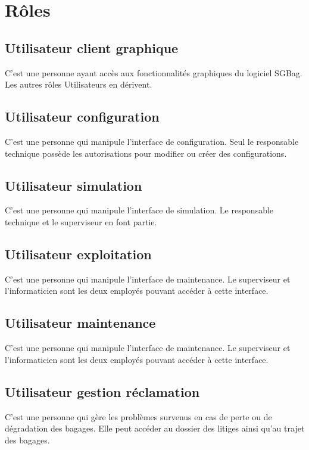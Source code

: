 \section{Rôles}
\subsection{Utilisateur client graphique}
\label{uiUser}
C'est une personne ayant accès aux fonctionnalités graphiques du logiciel SGBag. Les autres rôles \og Utilisateurs \fg en dérivent.

\subsection{Utilisateur configuration}
\label{confUser}
C'est une personne qui manipule l'interface de configuration. Seul le responsable technique possède les autorisations pour modifier ou créer des configurations.

\subsection{Utilisateur simulation}
\label{simUser}
C'est une personne qui manipule l'interface de simulation. Le responsable technique et le superviseur en font partie.

\subsection{Utilisateur exploitation}
\label{expUser}
C'est une personne qui manipule l'interface de maintenance. Le superviseur et l'informaticien sont les deux employés pouvant accéder à cette interface.

\subsection{Utilisateur maintenance}
\label{mntUser}
C'est une personne qui manipule l'interface de maintenance. Le superviseur et l'informaticien sont les deux employés pouvant accéder à cette interface.

\subsection{Utilisateur gestion réclamation}
\label{recUser}
C'est une personne qui gère les problèmes survenus en cas de perte ou de dégradation des bagages. Elle peut accéder au dossier des litiges ainsi qu'au trajet des bagages.

